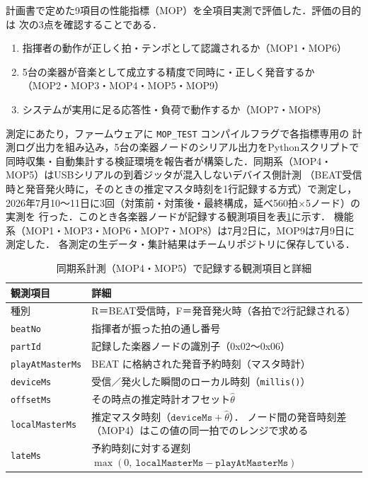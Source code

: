 \documentclass[uplatex,dvipdfmx]{jlreq}
\newcommand{\code}[1]{\texttt{#1}}
\begin{document}
計画書で定めた9項目の性能指標（MOP）を全項目実測で評価した．評価の目的は
次の3点を確認することである．

\begin{enumerate}
  \item 指揮者の動作が正しく拍・テンポとして認識されるか（MOP1・MOP6）
  \item 5台の楽器が音楽として成立する精度で同時に・正しく発音するか
    （MOP2・MOP3・MOP4・MOP5・MOP9）
  \item システムが実用に足る応答性・負荷で動作するか（MOP7・MOP8）
\end{enumerate}

測定にあたり，ファームウェアに \code{MOP\_TEST} コンパイルフラグで各指標専用の
計測ログ出力を組み込み，5台の楽器ノードのシリアル出力をPythonスクリプトで
同時収集・自動集計する検証環境を報告者が構築した．同期系（MOP4・MOP5）はUSBシリアルの到着ジッタが混入しないデバイス側計測
（BEAT受信時と発音発火時に，そのときの推定マスタ時刻を1行記録する方式）で測定し，
2026年7月10〜11日に3回（対策前・対策後・最終構成，延べ560拍$\times$5ノード）の実測を
行った．このとき各楽器ノードが記録する観測項目を表\ref{tab:obs-items}に示す．
機能系（MOP1・MOP3・MOP6・MOP7・MOP8）は7月2日に，MOP9は7月9日に測定した．
各測定の生データ・集計結果はチームリポジトリに保存している．

\begin{table}[tbp]
  \centering
  \caption{同期系計測（MOP4・MOP5）で記録する観測項目と詳細}\label{tab:obs-items}
  \small
  \begin{tabular}{lp{8.6cm}}
    \hline
    観測項目 & 詳細 \\
    \hline
    種別 & R＝BEAT受信時，F＝発音発火時（各拍で2行記録される） \\
    \code{beatNo} & 指揮者が振った拍の通し番号 \\
    \code{partId} & 記録した楽器ノードの識別子（0x02〜0x06） \\
    \code{playAtMasterMs} & BEAT に格納された発音予約時刻（マスタ時計） \\
    \code{deviceMs} & 受信／発火した瞬間のローカル時刻（\code{millis()}） \\
    \code{offsetMs} & その時点の推定時計オフセット$\hat{\theta}$ \\
    \code{localMasterMs} & 推定マスタ時刻（$\code{deviceMs} + \hat{\theta}$）．
      ノード間の発音時刻差（MOP4）はこの値の同一拍でのレンジで求める \\
    \code{lateMs} & 予約時刻に対する遅刻 $\max(0,\ \code{localMasterMs} - \code{playAtMasterMs})$ \\
    \hline
  \end{tabular}
\end{table}
\end{document}
